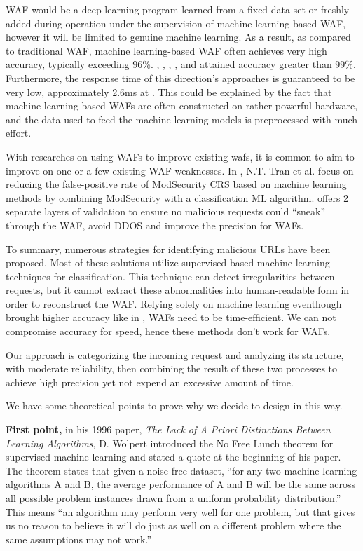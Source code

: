 WAF would be a deep learning program learned from a fixed data set or freshly added during operation under the supervision of machine learning-based WAF, however it will be limited to genuine machine learning. As a result, as compared to traditional WAF, machine learning-based WAF often achieves very high accuracy, typically exceeding 96\%. \cite{Jemal}, \cite{Toprak}, \cite{Gogoi}, \cite{Devi}, and \cite{Alshammari} attained accuracy greater than 99\%. Furthermore, the response time of this direction's approaches is guaranteed to be very low, approximately 2.6ms at \cite{Jemal}. This could be explained by the fact that machine learning-based WAFs are often constructed on rather powerful hardware, and the data used to feed the machine learning models is preprocessed with much effort.

With researches on using WAFs to improve existing wafs, it is common to aim to improve on one or a few existing WAF weaknesses. In \cite{Tin}, N.T. Tran et al. focus on reducing the false-positive rate of ModSecurity CRS based on machine learning methods by combining ModSecurity with a classification ML algorithm. \cite{Dawadi} offers 2 separate layers of validation to ensure no malicious requests could “sneak” through the WAF, avoid DDOS and improve the precision for WAFs.
 
To summary, numerous strategies for identifying malicious URLs have been proposed. Most of these solutions utilize supervised-based machine learning techniques for classification. This technique can detect irregularities between requests, but it cannot extract these abnormalities into human-readable form in order to reconstruct the WAF. Relying solely on machine learning eventhough brought higher accuracy like in \cite{s22093373}, WAFs need to be time-efficient. We can not compromise accuracy for speed, hence these methods don't work for WAFs.

Our approach is categorizing the incoming request and analyzing its structure, with moderate reliability, then combining the result of these two processes to achieve high precision yet not expend an excessive amount of time.

We have some theoretical points to prove why we decide to design in this way.

\textbf{First point,} in his 1996 paper, \emph{The Lack of A Priori Distinctions Between Learning Algorithms}, D. Wolpert\cite{wolpert} introduced the No Free Lunch theorem for supervised machine learning and stated a quote at the beginning of his paper. The theorem states that given a noise-free dataset, “for any two machine learning algorithms A and B, the average performance of A and B will be the same across all possible problem instances drawn from a uniform probability distribution.” This means  “an algorithm may perform very well for one problem, but that gives us no reason to believe it will do just as well on a different problem where the same assumptions may not work.”


